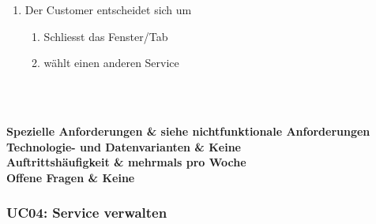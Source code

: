 \documentclass[11pt]{scrartcl}
\begin{document}
\begin{longtabu}
\begin{enumerate}
\begin{enumerate}
		       \item  Der Customer entscheidet sich um
		     \begin{enumerate}
		      \item Schliesst das Fenster/Tab
		      \item wählt einen anderen Service
		    \end{enumerate}
		    
		  \end{enumerate}
			
		\end{enumerate}
	 \\\hline

      \\\hline
	\bfseries Spezielle Anforderungen & siehe nichtfunktionale Anforderungen  \\\hline 
	\bfseries Technologie- und Datenvarianten & Keine  \\\hline 
	\bfseries Auftrittshäufigkeit & mehrmals pro Woche  \\\hline 
	\bfseries Offene Fragen & Keine  \\\hline  
\end{longtabu}
\newpage

\subsubsection{UC04: Service verwalten}
\end{document}
